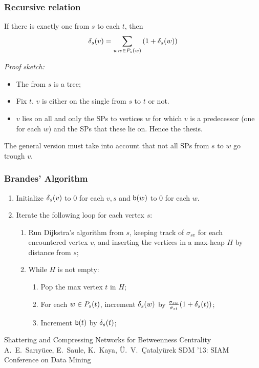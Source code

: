 \begin{frame}
  \frametitle{Recursive relation}
  \begin{theorem}
    If there is exactly one \spath from $s$ to each $t$, then
    \[
      \delta_s(v)=\sum_{w: v\in P_s(w)}\left(1+\delta_s(w)\right)
    \]
  \end{theorem}
  \pause
  \emph{Proof sketch:}
  \begin{itemize}
    \item The \spdag from $s$ is a tree;
    \item Fix $t$. $v$ is either on the single \spath from $s$ to $t$ or not.
    \item $v$ lies on all and only the SPs to vertices $w$ for which $v$ is a
      predecessor (one \spath for each $w$) and the SPs that these lie on. Hence the
      thesis.
  \end{itemize}
  \pause
  The general version must take into account that not all SPs from $s$ to $w$ go
  trough $v$.
\end{frame}

\begin{frame}
  \frametitle{Brandes' Algorithm}
  \begin{enumerate}
    \item Initialize $\delta_s(v)$ to $0$ for each $v,s$ and $\mathsf{b}(w)$ to $0$ for
      each $w$.
    \item Iterate the following loop for each vertex $s$:
      \begin{enumerate}
        \item Run Dijkstra's algorithm from $s$, keeping track of $\sigma_{sv}$ for
          each encountered vertex $v$, and inserting the vertices in a max-heap $H$ by
          distance from $s$;
        \item While $H$ is not empty:
          \begin{enumerate}
            \item Pop the max vertex $t$ in $H$;
            \item For each $w\in P_s(t)$, increment $\delta_s(w)$ by
              $\frac{\sigma_{sw}}{\sigma_{st}}(1+\delta_s(t))$;
            \item Increment $\mathsf{b}(t)$ by $\delta_s(t)$;
          \end{enumerate}
      \end{enumerate}
  \end{enumerate}
\end{frame}

\begin{frame}
  \centering
  \vfill
  {\huge Shattering and Compressing Networks for Betweenness Centrality}
  \vfill
  {\Large A.~E.~Sar\i y\"uce, E.~Saule, K.~Kaya, \"U.~V.~\c{C}ataly\"urek}
  \vfill
  {\large SDM '13: SIAM Conference on Data Mining}
  \vfill
\end{frame}

